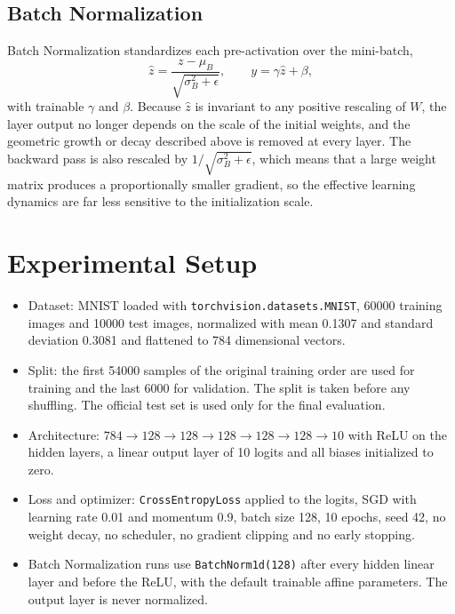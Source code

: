 \documentclass[12pt]{article}
\begin{document}
\subsection{Batch Normalization}

Batch Normalization standardizes each pre-activation over the mini-batch,
\begin{equation}
\hat{z} = \frac{z - \mu_B}{\sqrt{\sigma_B^2 + \epsilon}}, \qquad y = \gamma \hat{z} + \beta ,
\end{equation}
with trainable $\gamma$ and $\beta$. Because $\hat{z}$ is invariant to any positive rescaling of $W$, the layer output no longer depends on the scale of the initial weights, and the geometric growth or decay described above is removed at every layer. The backward pass is also rescaled by $1/\sqrt{\sigma_B^2 + \epsilon}$, which means that a large weight matrix produces a proportionally smaller gradient, so the effective learning dynamics are far less sensitive to the initialization scale.

\section{Experimental Setup}

\begin{itemize}
\item Dataset: MNIST loaded with \texttt{torchvision.datasets.MNIST}, 60000 training images and 10000 test images, normalized with mean 0.1307 and standard deviation 0.3081 and flattened to 784 dimensional vectors.
\item Split: the first 54000 samples of the original training order are used for training and the last 6000 for validation. The split is taken before any shuffling. The official test set is used only for the final evaluation.
\item Architecture: $784 \to 128 \to 128 \to 128 \to 128 \to 128 \to 10$ with ReLU on the hidden layers, a linear output layer of 10 logits and all biases initialized to zero.
\item Loss and optimizer: \texttt{CrossEntropyLoss} applied to the logits, SGD with learning rate 0.01 and momentum 0.9, batch size 128, 10 epochs, seed 42, no weight decay, no scheduler, no gradient clipping and no early stopping.
\item Batch Normalization runs use \texttt{BatchNorm1d(128)} after every hidden linear layer and before the ReLU, with the default trainable affine parameters. The output layer is never normalized.
\end{itemize}
\end{document}
